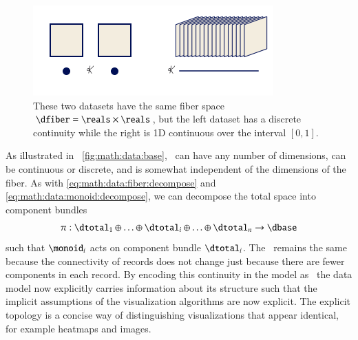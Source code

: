 \documentclass[journal]{vgtc}                %
\begin{document}
 \begin{figure}[htb]
  \centering %
  \includegraphics[width=\columnwidth]{base.png}
  \caption{These two datasets have the same fiber space  $\dfiber=\reals\times\reals$, but the left dataset has a discrete continuity while the right is 1D continuous over the interval $\left[0,1\right]$.}
  \label{fig:math:data:base}
 \end{figure}

 As illustrated in ~\autoref{fig:math:data:base}, \dbase\ can have any number of dimensions, can be continuous or discrete, and is somewhat independent of the dimensions of the fiber. As with \autoref{eq:math:data:fiber:decompose} and \autoref{eq:math:data:monoid:decompose},  we can decompose the total space into component bundles
 \begin{equation}\label{eq:math:data:base:decompose}
     \pi:\dtotal_1\oplus\ldots\oplus \dtotal_i \oplus\ldots \oplus \dtotal_n \rightarrow \dbase
 \end{equation}
 such that \(\monoid_{i}\) acts on component bundle \(\dtotal_i\). The \dbase\ remains the same because the connectivity of records does not change just because there are fewer components in each record. By encoding this continuity in the model as \dbase\, the data model now explicitly carries information about its structure such that the implicit assumptions of the visualization algorithms are now explicit. The explicit topology is a concise way of distinguishing visualizations that appear identical, for example heatmaps and images.  
\end{document}
